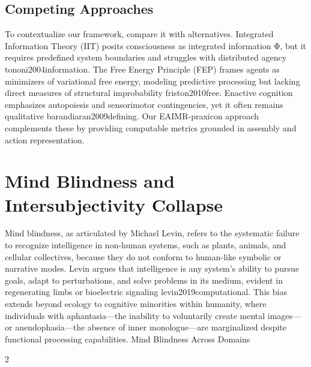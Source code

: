 \documentclass{article}
\begin{document}
\subsection{Competing Approaches}
To contextualize our framework, compare it with alternatives. Integrated Information Theory (IIT) posits
consciousness as integrated information Φ, but it requires predefined system boundaries and struggles with
distributed agency {tononi2004information}. The Free Energy Principle (FEP) frames agents as minimizers of variational free
energy, modeling predictive processing but lacking direct measures of structural improbability {friston2010free}. Enactive
cognition emphasizes autopoiesis and sensorimotor contingencies, yet it often remains qualitative {barandiaran2009defining}. Our
EAIMR-praxicon approach complements these by providing computable metrics grounded in assembly and
action representation.

\section{Mind Blindness and Intersubjectivity Collapse}
\label{sec:mind_blindness}

Mind blindness, as articulated by Michael Levin, refers to the systematic failure to recognize intelligence
in non-human systems, such as plants, animals, and cellular collectives, because they do not conform to
human-like symbolic or narrative modes. Levin argues that intelligence is any system’s ability to pursue
goals, adapt to perturbations, and solve problems in its medium, evident in regenerating limbs or bioelectric
signaling {levin2019computational}. This bias extends beyond ecology to cognitive minorities within humanity, where individuals
with aphantasia—the inability to voluntarily create mental images—or anendophasia—the absence of inner
monologue—are marginalized despite functional processing capabilities.
Mind Blindness Across Domains

2
\end{document}
